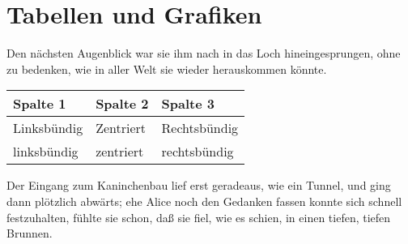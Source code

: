 \documentclass[DIV=calc,10pt,parskip=half,twocolumn]{article}
\begin{document}
\section{Tabellen und Grafiken}

Den nächsten Augenblick war sie ihm nach in das Loch hineingesprungen, ohne zu
bedenken, wie in aller Welt sie wieder herauskommen könnte.

\begin{center}
\begin{tabular}{lll}
  \toprule
   Spalte 1 &  Spalte 2 & Spalte 3\\
   \midrule
   Linksbündig & Zentriert & Rechtsbündig\\
   linksbündig & zentriert & rechtsbündig\\
   \bottomrule
\end{tabular}
\end{center}

Der Eingang zum Kaninchenbau lief erst geradeaus, wie ein Tunnel, und ging dann
plötzlich abwärts; ehe Alice noch den Gedanken fassen konnte sich schnell
festzuhalten, fühlte sie schon, daß sie fiel, wie es schien, in einen tiefen,
tiefen Brunnen.
\end{document}
